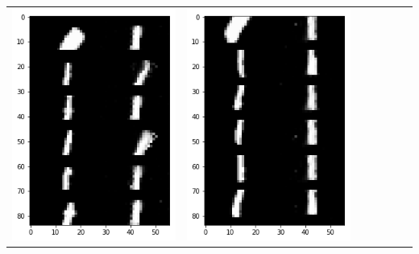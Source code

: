 \documentclass[12pt]{report} %
\begin{document}
\begin{tabular}{m{0.7cm}m{2.4cm}m{2.4cm}m{2.4cm}m{2.4cm}m{2.4cm}m{2.4cm}}
	\includegraphics[scale=0.3]{pictures/M1_1_up.png} & \includegraphics[scale=0.3]{pictures/M1_1_down.png} &

\end{tabular}
\end{document}
